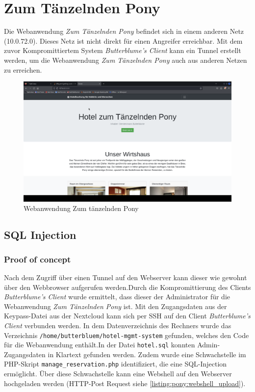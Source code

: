 \chapter{Zum Tänzelnden Pony}
Die Webanwendung \textit{Zum Tänzelnden Pony} befindet sich in einem anderen Netz (10.0.72.0). Dieses Netz ist nicht direkt für einen Angreifer erreichbar. Mit dem zuvor Kompromittiertem System \textit{Butterblume's Client} kann ein Tunnel erstellt werden, um die Webanwendung \textit{Zum Tänzelnden Pony} auch aus anderen Netzen zu erreichen.

\vfill
\begin{figure}[!ht]
    \centering
    \includegraphics[width=\linewidth]{images/screenshots/11_taenzelndes_pony.png}
    \caption{Webanwendung Zum tänzelnden Pony}
    \label{fig:09_taenzelndes_pony}
\end{figure}
\vfill
\newpage


\section{\makecvssbadge SQL Injection}

\subsection*{Proof of concept}
Nach dem Zugriff über einen Tunnel auf den Webserver kann dieser wie gewohnt über den Webbrowser aufgerufen werden.Durch die Kompromittierung des Clients \textit{Butterblume's Client} wurde ermittelt, dass dieser der Administrator für die Webanwendung \textit{Zum Tänzelnden Pony} ist. Mit den Zugangsdaten aus der Keypass-Datei aus der Nextcloud kann sich per SSH auf den Client \textit{Butterblume's Client} verbunden werden. In dem Datenverzeichnis des Rechners wurde das Verzeichnis \texttt{/home/butterbluem/hotel-mgmt-system} gefunden, welches den Code für die Webanwendung enthält.In der Datei \texttt{hotel.sql} konnten Admin-Zugangsdaten in Klartext gefunden werden. Zudem wurde eine Schwachstelle im PHP-Skript \texttt{manage\_reservation.php} identifiziert, die eine SQL-Injection ermöglicht. Über diese Schwachstelle kann eine Webshell auf den Webserver hochgeladen werden (HTTP-Post Request siehe \autoref{listing:pony:webshell_upload}).

